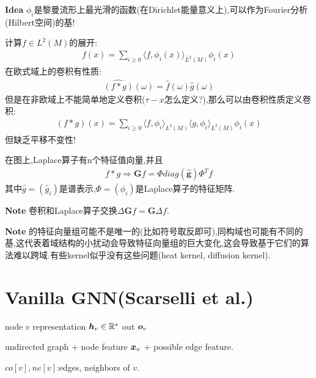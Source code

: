\documentclass{article}
\begin{document}
\textbf{Idea} $\phi_i$是黎曼流形上最光滑的函数(在Dirichlet能量意义上),可以作为Fourier分析(Hilbert空间)的基!

计算$f\in L^2(M)$的展开:
\begin{align}
    f(x)=\sum_{i\ge 0}\langle f,\phi_i(x)\rangle_{L^2(M)}\phi_i(x)
\end{align}
在欧式域上的卷积有性质:
\begin{align}
    \widehat{(f*g)}(\omega)=\hat{f}(\omega)\hat{g}(\omega)
\end{align}
但是在非欧域上不能简单地定义卷积($\tau-x$怎么定义?),那么可以由卷积性质定义卷积:
\begin{align}
    \left( f\ast g\right) \left( x\right) =\sum _{i\geq 0} \langle f,\phi _{i} \rangle_{L^2(M)} \langle g,\phi _{i} \rangle_{L^2(M)} \phi _{i}\left( x\right) 
\end{align}
但缺乏平移不变性! 

在图上,Laplace算子有n个特征值向量,并且
\begin{align}
    f*g \Rightarrow \mathbf{G}f=\Phi diag(\mathbf{\hat{g}}) \Phi^T f
\end{align}
其中$\widehat {g}=\left( \widehat {g}_i \right)$是谱表示,$\Phi=(\phi_i)$是Laplace算子的特征矩阵.

\textbf{Note} 卷积和Laplace算子交换$\Delta \mathbf{G} f=\mathbf{G} \Delta f$.

\textbf{Note} \lop 的特征向量组可能不是唯一的(比如符号取反即可),同构域也可能有不同的基,这代表着域结构的小扰动会导致特征向量组的巨大变化,这会导致基于它们的算法难以跨域.有些kernel似乎没有这些问题(heat kernel, diffusion kernel).



\section{Vanilla GNN(Scarselli et al.)}

 node $v$ \trarr  representation $\boldsymbol{h}_v \in \mathbb{R}^s$ \trarr  out $\boldsymbol{o}_v$

 undirected graph + node feature $\boldsymbol{x}_v$ + possible edge feature.

$co[v], ne[v]$:edges, neighbors of $v$.
\end{document}
